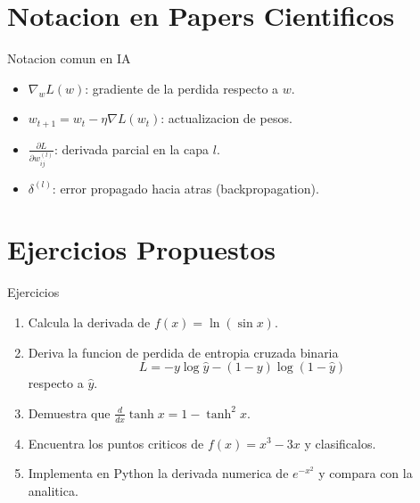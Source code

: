 \documentclass[aspectratio=169, 10pt, xcolor=table]{beamer}
\begin{document}
\section{Notacion en Papers Cientificos}

\begin{frame}{Notacion comun en IA}
    \begin{itemize}
        \item $\nabla_w L(w)$: gradiente de la perdida respecto a $w$.
        \item $w_{t+1} = w_t - \eta \nabla L(w_t)$: actualizacion de pesos.
        \item $\frac{\partial L}{\partial w_{ij}^{(l)}}$: derivada parcial en la capa $l$.
        \item $\delta^{(l)}$: error propagado hacia atras (backpropagation).
    \end{itemize}
\end{frame}

\section{Ejercicios Propuestos}

\begin{frame}{Ejercicios}
    \begin{enumerate}
        \item Calcula la derivada de $f(x) = \ln(\sin x)$.
        \item Deriva la funcion de perdida de entropia cruzada binaria
        \[
        L = -y\log\hat{y} - (1-y)\log(1-\hat{y})
        \]
        respecto a $\hat{y}$.
        \item Demuestra que $\frac{d}{dx}\tanh x = 1 - \tanh^2 x$.
        \item Encuentra los puntos criticos de $f(x) = x^3 - 3x$ y clasificalos.
        \item Implementa en Python la derivada numerica de $e^{-x^2}$ y compara con la analitica.
    \end{enumerate}
\end{frame}

\end{document}
